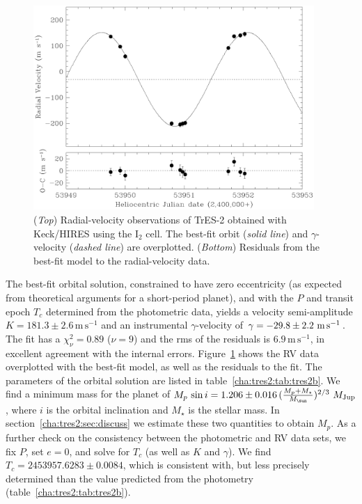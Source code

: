 \begin{figure}
\begin{center}
\includegraphics[width=0.95\textwidth]{4_f2}
\caption[Radial-velocity observations of TrES-2]{({\it Top}) Radial-velocity observations of TrES-2 obtained
  with Keck/HIRES using the I$_{2}$ cell. The best-fit orbit
  (\textit{solid line}) and $\gamma$-velocity (\textit{dashed line})
  are overplotted. ({\it Bottom}) Residuals from the best-fit
  model to the radial-velocity data.}
\label{cha:tres2:fig:rvtres2}
\end{center}
\end{figure}

The best-fit orbital solution, constrained to have zero eccentricity
(as expected from theoretical arguments for a short-period planet),
and with the $P$ and transit epoch $T_{c}$ determined from the
photometric data, yields a velocity semi-amplitude $K =
181.3\pm2.6\,\mathrm{m\,s^{-1}}$ and an instrumental
${\gamma}$-velocity of ${\gamma} = -29.8 \pm 2.2\ {\rm m\,
  s^{-1}}$. The fit has a $\chi^2_\nu = 0.89$ ($\nu=9$) and the rms of the
residuals is $6.9\,\mathrm{m\,s^{-1}}$, in excellent agreement with
the internal errors.  Figure~\ref{cha:tres2:fig:rvtres2} shows the RV data
overplotted with the best-fit model, as well as the residuals to the
fit. The parameters of the orbital solution are listed in
table~\ref{cha:tres2:tab:tres2b}. We find a minimum mass for the planet of
$M_{p}\, \sin{i} = 1.206 \pm 0.016\, (\frac{M_p + M_{\star}}{M_{\sun}})^{2/3}\ M_{\rm Jup}$, 
where $i$ is 
the orbital inclination and $M_{\star}$ 
is the stellar mass.  In section~\ref{cha:tres2:sec:discuss} we estimate these two quantities to obtain
$M_{p}$.  As a further check on the consistency between the
photometric and RV data sets, we fix $P$, set $e=0$, and solve for
$T_c$ (as well as $K$ and ${\gamma}$).  We find $T_{c}=2453957.6283
\pm 0.0084$, which is consistent with, but less precisely determined
than the value predicted from the photometry (table~\ref{cha:tres2:tab:tres2b}).


